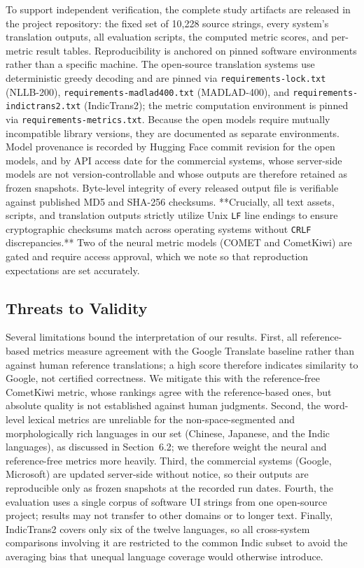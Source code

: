 \documentclass[Afour,sagev,times,doublespace]{sagej}
\begin{document}
To support independent verification, the complete study artifacts are released in the project repository: the fixed set of 10,228 source strings, every system's translation outputs, all evaluation scripts, the computed metric scores, and per-metric result tables. Reproducibility is anchored on pinned software environments rather than a specific machine. The open-source translation systems use deterministic greedy decoding and are pinned via \texttt{requirements-lock.txt} (NLLB-200), \texttt{requirements-madlad400.txt} (MADLAD-400), and \texttt{requirements-indictrans2.txt} (IndicTrans2); the metric computation environment is pinned via \texttt{requirements-metrics.txt}. Because the open models require mutually incompatible library versions, they are documented as separate environments. Model provenance is recorded by Hugging Face commit revision for the open models, and by API access date for the commercial systems, whose server-side models are not version-controllable and whose outputs are therefore retained as frozen snapshots. Byte-level integrity of every released output file is verifiable against published MD5 and SHA-256 checksums. **Crucially, all text assets, scripts, and translation outputs strictly utilize Unix \texttt{LF} line endings to ensure cryptographic checksums match across operating systems without \texttt{CRLF} discrepancies.** Two of the neural metric models (COMET and CometKiwi) are gated and require access approval, which we note so that reproduction expectations are set accurately.

\subsection{Threats to Validity}

Several limitations bound the interpretation of our results. First, all reference-based metrics measure agreement with the Google Translate baseline rather than against human reference translations; a high score therefore indicates similarity to Google, not certified correctness. We mitigate this with the reference-free CometKiwi metric, whose rankings agree with the reference-based ones, but absolute quality is not established against human judgments. Second, the word-level lexical metrics are unreliable for the non-space-segmented and morphologically rich languages in our set (Chinese, Japanese, and the Indic languages), as discussed in Section~6.2; we therefore weight the neural and reference-free metrics more heavily. Third, the commercial systems (Google, Microsoft) are updated server-side without notice, so their outputs are reproducible only as frozen snapshots at the recorded run dates. Fourth, the evaluation uses a single corpus of software UI strings from one open-source project; results may not transfer to other domains or to longer text. Finally, IndicTrans2 covers only six of the twelve languages, so all cross-system comparisons involving it are restricted to the common Indic subset to avoid the averaging bias that unequal language coverage would otherwise introduce.
\end{document}
